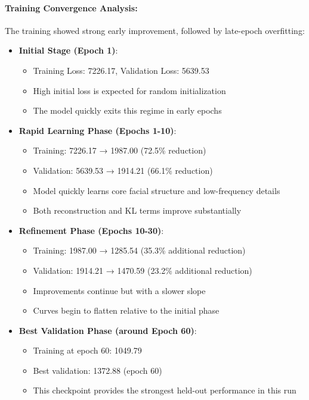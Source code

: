 \documentclass[conference]{IEEEtran}
\begin{document}
\paragraph{Training Convergence Analysis:}

The training showed strong early improvement, followed by late-epoch overfitting:

\begin{itemize}
    \item \textbf{Initial Stage (Epoch 1)}:
    \begin{itemize}
        \item Training Loss: 7226.17, Validation Loss: 5639.53
        \item High initial loss is expected for random initialization
        \item The model quickly exits this regime in early epochs
    \end{itemize}
    
    \item \textbf{Rapid Learning Phase (Epochs 1-10)}:
    \begin{itemize}
        \item Training: 7226.17 → 1987.00 (72.5\% reduction)
        \item Validation: 5639.53 → 1914.21 (66.1\% reduction)
        \item Model quickly learns core facial structure and low-frequency details
        \item Both reconstruction and KL terms improve substantially
    \end{itemize}
    
    \item \textbf{Refinement Phase (Epochs 10-30)}:
    \begin{itemize}
        \item Training: 1987.00 → 1285.54 (35.3\% additional reduction)
        \item Validation: 1914.21 → 1470.59 (23.2\% additional reduction)
        \item Improvements continue but with a slower slope
        \item Curves begin to flatten relative to the initial phase
    \end{itemize}
    
    \item \textbf{Best Validation Phase (around Epoch 60)}:
    \begin{itemize}
        \item Training at epoch 60: 1049.79
        \item Best validation: 1372.88 (epoch 60)
        \item This checkpoint provides the strongest held-out performance in this run
    \end{itemize}
    

\end{itemize}
\end{document}

